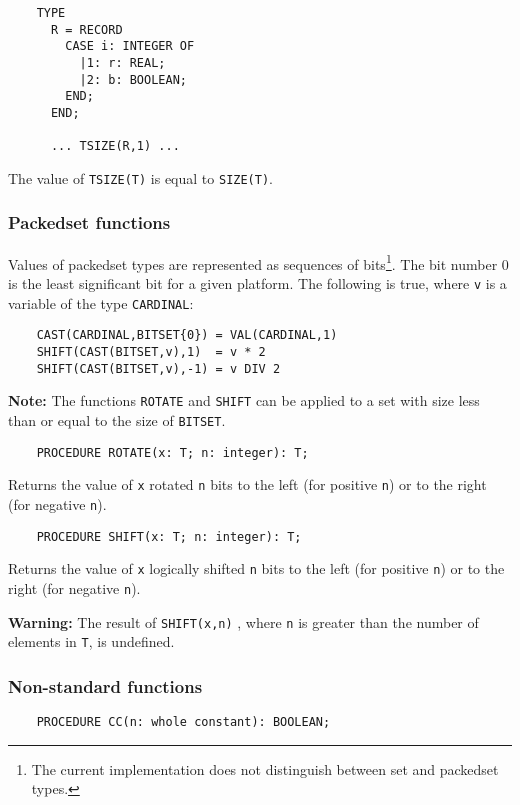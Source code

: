 \Example
\begin{verbatim}
    TYPE
      R = RECORD
        CASE i: INTEGER OF
          |1: r: REAL;
          |2: b: BOOLEAN;
        END;
      END;

      ... TSIZE(R,1) ...

\end{verbatim}

The value of {\tt TSIZE(T)} is equal to {\tt SIZE(T)}.

\subsubsection{Packedset functions}

Values of packedset types are represented as sequences of bits\footnote{The current
implementation does not distinguish between set and packedset types.}.
The bit number 0 is the least significant bit
for a given platform. The following is true, where {\tt v} is a variable
of the type {\tt CARDINAL}:
\begin{verbatim}
    CAST(CARDINAL,BITSET{0}) = VAL(CARDINAL,1)
    SHIFT(CAST(BITSET,v),1)  = v * 2
    SHIFT(CAST(BITSET,v),-1) = v DIV 2
\end{verbatim}

{\bf Note:} The functions {\tt ROTATE} and {\tt SHIFT} can be applied
to a set with size less than or equal to the size of {\tt BITSET}.

\verb'    PROCEDURE ROTATE(x: T; n: integer): T;'

Returns the value of \verb|x| rotated \verb|n| bits to the left (for
positive \verb|n|) or to the right (for negative \verb|n|).

\verb'    PROCEDURE SHIFT(x: T; n: integer): T;'

Returns the value of \verb|x| logically shifted \verb|n| bits to
the left (for positive \verb|n|) or to the right (for negative
\verb|n|).

{\bf Warning:} The result of \verb'SHIFT(x,n)' , where \verb'n' is greater 
than the number of elements in \verb'T', is undefined.

\subsubsection{Non-standard functions}
\label{m2:sysfunc:nonstandard}

\verb'    PROCEDURE CC(n: whole constant): BOOLEAN;'



